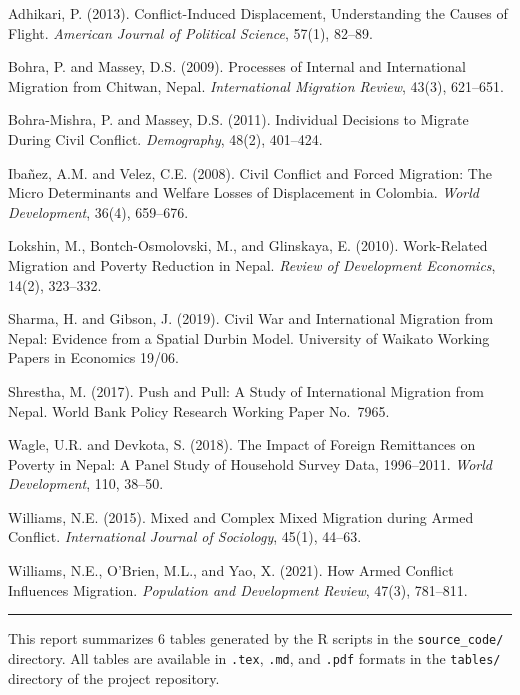 \documentclass[12pt,letterpaper]{article}
\begin{document}
\begin{enumerate}[nosep,label={[\arabic*]}]
    \item \label{ref:adhikari} Adhikari, P. (2013). Conflict-Induced Displacement, Understanding the Causes of Flight. \textit{American Journal of Political Science}, 57(1), 82--89.

    \item \label{ref:bohra2009} Bohra, P. and Massey, D.S. (2009). Processes of Internal and International Migration from Chitwan, Nepal. \textit{International Migration Review}, 43(3), 621--651.

    \item \label{ref:bohra2011} Bohra-Mishra, P. and Massey, D.S. (2011). Individual Decisions to Migrate During Civil Conflict. \textit{Demography}, 48(2), 401--424.

    \item \label{ref:ibanez} Iba\~{n}ez, A.M. and Velez, C.E. (2008). Civil Conflict and Forced Migration: The Micro Determinants and Welfare Losses of Displacement in Colombia. \textit{World Development}, 36(4), 659--676.

    \item \label{ref:lokshin} Lokshin, M., Bontch-Osmolovski, M., and Glinskaya, E. (2010). Work-Related Migration and Poverty Reduction in Nepal. \textit{Review of Development Economics}, 14(2), 323--332.

    \item \label{ref:sharma} Sharma, H. and Gibson, J. (2019). Civil War and International Migration from Nepal: Evidence from a Spatial Durbin Model. University of Waikato Working Papers in Economics 19/06.

    \item \label{ref:shrestha} Shrestha, M. (2017). Push and Pull: A Study of International Migration from Nepal. World Bank Policy Research Working Paper No.\ 7965.

    \item \label{ref:wagle} Wagle, U.R. and Devkota, S. (2018). The Impact of Foreign Remittances on Poverty in Nepal: A Panel Study of Household Survey Data, 1996--2011. \textit{World Development}, 110, 38--50.

    \item \label{ref:williams2015} Williams, N.E. (2015). Mixed and Complex Mixed Migration during Armed Conflict. \textit{International Journal of Sociology}, 45(1), 44--63.

    \item \label{ref:williams2021} Williams, N.E., O'Brien, M.L., and Yao, X. (2021). How Armed Conflict Influences Migration. \textit{Population and Development Review}, 47(3), 781--811.
\end{enumerate}

\vspace{1em}
\noindent\rule{\textwidth}{0.4pt}
{\small This report summarizes 6 tables generated by the R scripts in the \texttt{source\_code/} directory. All tables are available in \texttt{.tex}, \texttt{.md}, and \texttt{.pdf} formats in the \texttt{tables/} directory of the project repository.}
\end{document}
